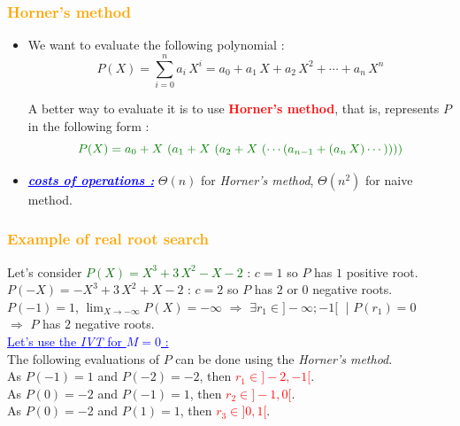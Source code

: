 \begin{frame}[fragile]
\frametitle{\textbf{\textcolor{orange}{Horner's method}}}

\begin{itemize}
\item We want to evaluate the following polynomial :
$$P(X) = \sum_{i=0}^{n} a_i\, X^i = a_0 + a_1\, X + a_2\, X^2 + \cdots + a_n\, X^n$$

\begin{block}{}
A better way to evaluate it is to use \textcolor{red}{\textbf{Horner's method}}, that is, represents $P$ in the following form :
$$\textcolor{darkgreen}{P(X) = a_0 + X\, \left(a_1 + X\, \left(a_2 + X\,\left(\cdots \left(a_{n-1} + \left(a_n\, X\right)\cdots \right)\right)\right)\right)}$$
\end{block}

\item \textcolor{blue}{\underline{\textbf{\textit{costs of operations :}}}} $\Theta(n)$ for \textit{Horner's method}, $\Theta(n^2)$ for naive method.
\end{itemize}

\end{frame}

\begin{frame}[fragile]
\frametitle{\textbf{\textcolor{orange}{Example of real root search}}}

Let's consider \textcolor{darkgreen}{$P(X) = X^3 + 3\, X^2 - X - 2$} : $c = 1$ so $P$ has $1$ positive root. \\
$P(-X) = -X^3 + 3\, X^2 + X - 2$ : $c = 2$ so $P$ has $2$ or $0$ negative roots.\\
\vspace{4mm}
$P(-1) = 1$, $\lim_{X \to -\infty} P(X) = -\infty$ $\Rightarrow$ $\exists r_{1}\in ]-\infty; -1[\;$ | $P(r_1) = 0$ \\
$\Rightarrow$ $P$ has $2$ negative roots.\\
\vspace{4mm}
\textcolor{blue}{\underline{Let's use the \textit{IVT} for $M = 0$ :}} \\
The following evaluations of $P$ can be done using the \textit{Horner's method}.\\
As $P(-1) =  1$ and $P(-2) = -2$, then \textcolor{red}{$r_1\in ]-2, -1[$}.\\
As $P(0)  = -2$ and $P(-1) =  1$, then \textcolor{red}{$r_2\in ]-1,  0[$}.\\
As $P(0)  = -2$ and $P(1)  =  1$, then \textcolor{red}{$r_3\in ] 0,  1[$}.

\end{frame}

